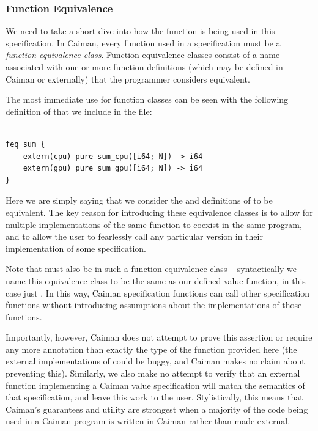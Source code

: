 \subsubsection{Function Equivalence}
\label{subsec:equivalence}

We need to take a short dive into how the  function is being used in this  specification.  In Caiman, every function used in a specification must be a \textit{function equivalence class}.  Function equivalence classes consist of a name associated with one or more function definitions (which may be defined in Caiman or externally) that the programmer considers equivalent.

The most immediate use for function classes can be seen with the following definition of  that we include in the  file:
%
\begin{lstlisting}

feq sum {
    extern(cpu) pure sum_cpu([i64; N]) -> i64
    extern(gpu) pure sum_gpu([i64; N]) -> i64
}
\end{lstlisting}
%
Here we are simply saying that we consider the  and  definitions of  to be equivalent.  The key reason for introducing these equivalence classes is to allow for multiple implementations of the same function to coexist in the same program, and to allow the user to fearlessly call any particular version in their implementation of some specification.  

Note that  must also be in such a function equivalence class -- syntactically we name this equivalence class to be the same as our defined value function, in this case just .  In this way, Caiman specification functions can call other specification functions without introducing assumptions about the implementations of those functions.  

Importantly, however, Caiman does not attempt to prove this assertion or require any more annotation than exactly the type of the function provided here (the external implementations of  could be buggy, and Caiman makes no claim about preventing this).  Similarly, we also make no attempt to verify that an external function implementing a Caiman value specification will match the semantics of that specification, and leave this work to the user.  Stylistically, this means that Caiman's guarantees and utility are strongest when a majority of the code being used in a Caiman program is written in Caiman rather than made external.  

